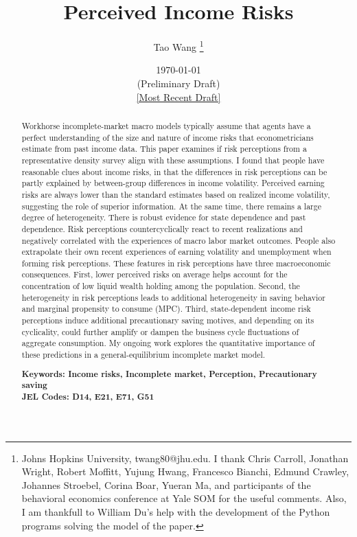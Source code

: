 \begin{titlepage}
 \title{Perceived Income Risks}
 
 \author{Tao Wang \thanks{Johns Hopkins University, twang80@jhu.edu. I thank Chris Carroll, Jonathan Wright, Robert Moffitt, Yujung Hwang, Francesco Bianchi, Edmund Crawley, Johannes Stroebel, Corina Boar, Yueran Ma, and participants of the behavioral economics conference at Yale SOM for the useful comments. Also, I am thankfull to William Du's help with the development of the Python programs solving the model of the paper.}}

\date{\today \\(Preliminary Draft) \\\href{https://github.com/TaoWangEcon/TaoWangEcon.github.io/blob/master/papers/PerceivedIncomeRisk.pdf}{[Most Recent Draft]}}
	\maketitle
	\begin{abstract}
	\begin{singlespace}
		\noindent Workhorse incomplete-market macro models typically assume that agents have a perfect understanding of the size and nature of income risks that econometricians estimate from past income data. This paper examines if risk perceptions from a representative density survey align with these assumptions. I found that people have reasonable clues about income risks, in that the differences in risk perceptions can be partly explained by between-group differences in income volatility. Perceived earning risks are always lower than the standard estimates based on realized income volatility, suggesting the role of superior information. At the same time, there remains a large degree of heterogeneity. There is robust evidence for state dependence and past dependence. Risk perceptions countercyclically react to recent realizations and negatively correlated with the experiences of macro labor market outcomes. People also extrapolate their own recent experiences of earning volatility and unemployment when forming risk perceptions. These features in risk perceptions have three macroeconomic consequences. First, lower perceived risks on average helps account for the concentration of low liquid wealth holding among the population. Second, the heterogeneity in risk perceptions leads to additional heterogeneity in saving behavior and marginal propensity to consume (MPC). Third, state-dependent income risk perceptions induce additional precautionary saving motives, and depending on its cyclicality, could further amplify or dampen the business cycle fluctuations of aggregate consumption. My ongoing work explores the quantitative importance of these predictions in a general-equilibrium incomplete market model. 
	\end{singlespace}

		\noindent \textbf{Keywords: Income risks, Incomplete market, Perception, Precautionary saving } \\
		\noindent \textbf{JEL Codes: D14, E21, E71, G51} 

	\end{abstract}

\end{titlepage}
